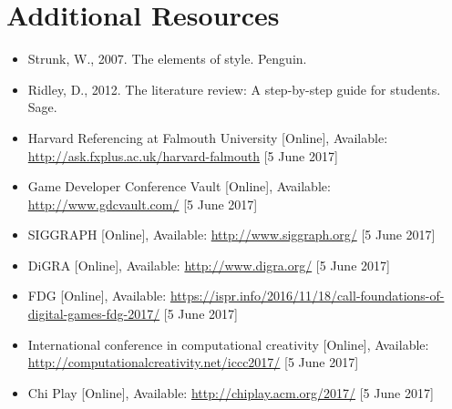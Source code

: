 \documentclass{../../fal_assignment}
\begin{document}
\section*{Additional Resources}

\begin{itemize}
     \item Strunk, W., 2007. The elements of style. Penguin.
     \item Ridley, D., 2012. The literature review: A step-by-step guide for students. Sage.
     \item Harvard Referencing at Falmouth University [Online], Available: \url{http://ask.fxplus.ac.uk/harvard-falmouth} [5 June 2017]
     \item Game Developer Conference Vault [Online], Available: \url{http://www.gdcvault.com/} [5 June 2017]
     \item SIGGRAPH [Online], Available: \url{http://www.siggraph.org/}  [5 June 2017]
     \item DiGRA [Online], Available: \url{http://www.digra.org/}  [5 June 2017]
     \item FDG [Online], Available: \url{https://ispr.info/2016/11/18/call-foundations-of-digital-games-fdg-2017/}  [5 June 2017]
     \item International conference in computational creativity [Online], Available: \url{http://computationalcreativity.net/iccc2017/}  [5 June 2017]
     \item Chi Play [Online], Available: \url{http://chiplay.acm.org/2017/}  [5 June 2017]
     
    
\end{itemize}
\end{document}
